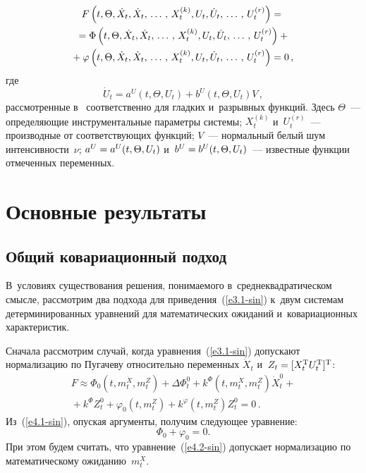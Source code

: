 \begin{multicols}{2}
\noindent
\begin{multline*}
    F\left(t, \Theta,\dot X_t, \dot X_t,\,\ldots\,,\, X_t^{(k)}, U_t, \dot  U_t,\,\ldots\,,\,  U_t^{(r)}\right) ={}\\
{}=\Phi\left(t, \Theta,\dot X_t, \dot X_t,\,\ldots\,,\, X_t^{(k)}, U_t, \dot  U_t,\,\ldots\,,\,  U_t^{(r)}\right) +{}\\
\!{}+\varphi \left(t, \Theta,\dot X_t, \dot X_t,\,\ldots\,,\, X_t^{(k)}, U_t, \dot  U_t,\,\ldots\,,\,  U_t^{(r)}\right)=0\,,
\end{multline*}
где
\begin{equation*}
    \dot U_t =a^U\left(t,\Theta, U_t\right)+b^U\left(t,\Theta, U_t\right)V\,, 
\end{equation*}
рассмотренные в~\cite{1-sin, 2-sin, 5-sin} соответственно для гладких и~разрывных функций.
Здесь $\Theta$~--- опре\-де\-ля\-ющие инструментальные па\-ра\-мет\-ры сис\-те\-мы;
 $X_t^{(k)}$ и~$U_t^{(r)}$~--- производные от соответствующих функций; $V$~--- 
 нормальный белый шум интенсивности~$\nu$; $a^U \hm=a^U(t,\Theta, U_t)$
 и~$b^U \hm=b^U(t,\Theta, U_t)$~--- известные функции отмеченных переменных.


\section{Основные результаты}

\subsection{Общий ковариационный подход} 

В~условиях существования решения, 
по\-ни\-ма\-емо\-го в~среднеквадратическом смысле, рассмотрим два подхода для приведения~(\ref{e3.1-sin}) 
к~двум сис\-те\-мам детерминированных уравнений для математических ожиданий и~ковариационных характеристик.

Сначала рассмотрим случай, когда уравнения~(\ref{e3.1-sin}) 
допускают нормализацию по Пугачеву относительно переменных $\dot X_t$ 
и~$Z_t \hm=[X_t^{\mathrm{T}} U_t^{\mathrm{T}}]^{\mathrm{T}}$:
\begin{multline}
    \!F\approx \Phi_0\left(t, m_t^{\dot X},m_t^Z\right) +\Delta\Phi_t^0 +k^\Phi\left(t, 
    m_t^{\dot X},m_t^Z\right) \dot X_t^0+{}\\
    {}+k^\Phi Z_t^0+\varphi_0 \left(t, m_t^Z\right) + k^\varphi \left(t, m_t^Z\right) Z_t^0 =0\,.
    \label{e4.1-sin} 
  \end{multline}
Из~(\ref{e4.1-sin}), опуская аргументы, получим сле\-ду\-ющее уравнение:
  \begin{equation}
    \Phi_0+\varphi_0=0.
    \label{e4.2-sin}
\end{equation}
При этом будем считать, что уравнение~(\ref{e4.2-sin}) 
допускает нормализацию по математическому ожиданию~$m_t^{\dot X}$.


\end{multicols}
